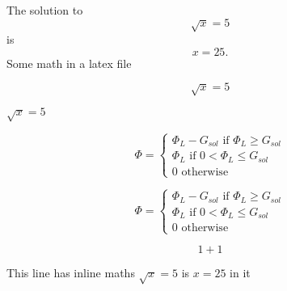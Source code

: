 \documentclass{article}
\begin{document}
The solution to \[\sqrt{x} = 5\] is \[x=25.\]
Some math in a latex file


\[\sqrt{x} = 5\]

\(\sqrt{x} = 5\)

$$
\Phi = \begin{cases}
\Phi_L - G_{sol} \text{ if } \Phi_L \geq G_{sol}\\
\Phi_L \text{ if }  0 <\Phi_L \leq G_{sol}\\
0 \text{ otherwise }
\end{cases}
$$

\begin{equation}
\Phi = \begin{cases}
\Phi_L - G_{sol} \text{ if } \Phi_L \geq G_{sol}\\
\Phi_L \text{ if }  0 <\Phi_L \leq G_{sol}\\
0 \text{ otherwise }
\end{cases}
\end{equation}



\begin{equation}
  1+1
\end{equation}

This line has inline maths $\sqrt{x} = 5$ is $x=25$ in it
\end{document}
